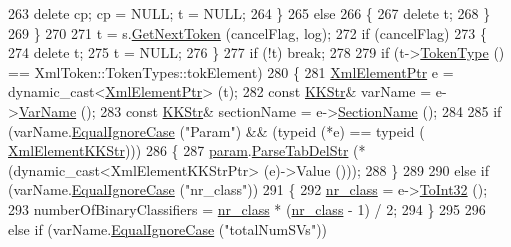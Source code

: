 \begin{DoxyCode}
263         \textcolor{keyword}{delete}  cp;  cp = NULL;  t = NULL;
264       \}
265       \textcolor{keywordflow}{else}
266       \{
267         \textcolor{keyword}{delete} t;
268       \}
269     \}
270 
271     t = s.\hyperlink{class_k_k_b_1_1_xml_stream_a87cc738b05c666cf5d5c25beaab477b4}{GetNextToken} (cancelFlag, log);
272     \textcolor{keywordflow}{if}  (cancelFlag)
273     \{
274       \textcolor{keyword}{delete}  t;
275       t = NULL;
276     \}
277     \textcolor{keywordflow}{if}  (!t)  \textcolor{keywordflow}{break};
278 
279     \textcolor{keywordflow}{if}  (t->\hyperlink{class_k_k_b_1_1_xml_token_ae98e2c1a798882647578cae4adcd7176}{TokenType} () == XmlToken::TokenTypes::tokElement)
280     \{
281       \hyperlink{class_k_k_b_1_1_xml_element}{XmlElementPtr}  e = \textcolor{keyword}{dynamic\_cast<}\hyperlink{class_k_k_b_1_1_xml_element}{XmlElementPtr}\textcolor{keyword}{>} (t);
282       \textcolor{keyword}{const} \hyperlink{class_k_k_b_1_1_k_k_str}{KKStr}&  varName = e->\hyperlink{class_k_k_b_1_1_xml_element_aef57cf00be66a3a387ce849b35125f51}{VarName} ();
283       \textcolor{keyword}{const} \hyperlink{class_k_k_b_1_1_k_k_str}{KKStr}&  sectionName = e->\hyperlink{class_k_k_b_1_1_xml_element_a2b85dcb37a0f63bd7979d16d12296876}{SectionName} ();
284 
285       \textcolor{keywordflow}{if}  (varName.\hyperlink{class_k_k_b_1_1_k_k_str_a562f9696417c53f66bc4088eac072ab5}{EqualIgnoreCase} (\textcolor{stringliteral}{"Param"})  &&  (\textcolor{keyword}{typeid} (*e) == \textcolor{keyword}{typeid} (
      \hyperlink{class_k_k_b_1_1_xml_element_k_k_str}{XmlElementKKStr})))
286       \{
287         \hyperlink{struct_s_v_m233_1_1_svm_model233_aea9d5d416f02777981c7677da2044571}{param}.\hyperlink{struct_s_v_m233_1_1svm__parameter_a4f1419736814d5c7185dfc36ed331ea4}{ParseTabDelStr} (*(dynamic\_cast<XmlElementKKStrPtr> (e)->Value ()));
288       \}
289 
290       \textcolor{keywordflow}{else} \textcolor{keywordflow}{if}  (varName.\hyperlink{class_k_k_b_1_1_k_k_str_a562f9696417c53f66bc4088eac072ab5}{EqualIgnoreCase} (\textcolor{stringliteral}{"nr\_class"}))
291       \{
292         \hyperlink{struct_s_v_m233_1_1_svm_model233_a55a9d2b4d87f50f14dfdcc1afc65b47b}{nr\_class} = e->\hyperlink{class_k_k_b_1_1_xml_element_aac7463c7b305f66b5157f424a0a76363}{ToInt32} ();
293         numberOfBinaryClassifiers = \hyperlink{struct_s_v_m233_1_1_svm_model233_a55a9d2b4d87f50f14dfdcc1afc65b47b}{nr\_class} * (\hyperlink{struct_s_v_m233_1_1_svm_model233_a55a9d2b4d87f50f14dfdcc1afc65b47b}{nr\_class} - 1) / 2;
294       \}
295 
296       \textcolor{keywordflow}{else} \textcolor{keywordflow}{if}  (varName.\hyperlink{class_k_k_b_1_1_k_k_str_a562f9696417c53f66bc4088eac072ab5}{EqualIgnoreCase} (\textcolor{stringliteral}{"totalNumSVs"}))

\end{DoxyCode}
